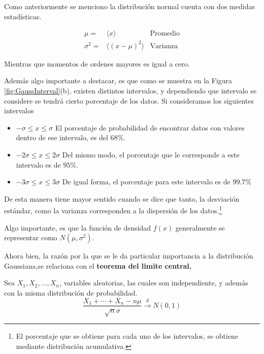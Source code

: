 Como anteriormente se menciono la distribución normal cuenta con dos medidas estadísticas.

\begin{align}
	\mu=& \langle x\rangle & \text{Promedio}\\
	\sigma^2=& \langle (x-\mu)^2\rangle& \text{Varianza}
\end{align}

Mientras que momentos de ordenes mayores es igual a cero.

Además algo importante a destacar, es que como se muestra en la Figura \ref{fig:GaussInterval}(b), existen distintos intervalos, y dependiendo que intervalo se considere se tendrá cierto porcentaje de los datos.
Si consideramos los siguientes intervalos

\begin{itemize}
	\item $-\sigma \leq x \leq \sigma$ 
	El porcentaje de probabilidad de encontrar datos con valores dentro de ese intervalo, es del $68\%$.
	\item $-2\sigma \leq x \leq 2\sigma$
	Del mismo modo, el porcentaje que le corresponde a este intervalo es de $95\%$.
	\item $-3\sigma\leq x\leq 3\sigma$
	De igual forma, el porcentaje para este intervalo es de $99.7\%$
\end{itemize} 


De esta manera tiene mayor sentido cuando se dice que tanto, la desviación estándar, como la varianza corresponden a la dispersión de los datos.\footnote{El porcentaje que se obtiene para cada uno de los intervalos, se obtiene mediante distribución acumulativa.}

Algo importante, es que la función de densidad $f(x)$ generalmente se representar como $N(\mu,\sigma^2)$.

Ahora bien, la razón por la que se le da particular importancia a la distribución Gaussiana,se relaciona con el \textbf{teorema del limite central.}

\begin{tcolorbox}[colback=mycafeF!5!white,colframe=mycafeF,title=\textbf{Teorema del limite central (CLT).}]
Sea $X_1,X_2,\dots,X_n$, variables aleatorias, las cuales son independiente, y además con la misma distribución de probabilidad.
\begin{equation}
	\frac{X_1+\cdots + X_n - n\mu}{\sqrt{n}\sigma}\overset{d}{\to} N(0,1)
    \label{eq:CLT}
\end{equation}

    
\end{tcolorbox}

